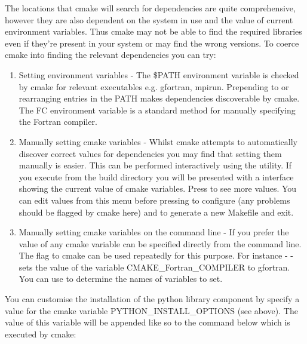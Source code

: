 \documentclass[letterpaper,10pt,english]{sphinxmanual}
\begin{document}

The locations that cmake will search for dependencies are quite comprehensive, however they are also dependent on the system in use and the value of current environment variables. Thus cmake may not be able to find the required libraries even if they’re present in your system or may find the wrong versions. To coerce cmake into finding the relevant dependencies you can try:
\begin{enumerate}
\item {} 
Setting environment variables - The \$PATH environment variable is checked by cmake for relevant executables e.g. gfortran, mpirun. Prepending to or rearranging entries in the PATH makes dependencies discoverable by cmake. The FC environment variable is a standard method for manually specifying the Fortran compiler.

\item {} 
Manually setting cmake variables - Whilst cmake attempts to automatically discover correct values for dependencies you may find that setting them manually is easier. This can be performed interactively using the  utility. If you execute  from the build directory you will be presented with a interface showing the current value of cmake variables. Press  to see more values. You can edit values from this menu before pressing  to configure (any problems should be flagged by cmake here) and  to generate a new Makefile and exit.

\item {} 
Manually setting cmake variables on the command line - If you prefer the value of any cmake variable can be specified directly from the command line. The  flag to cmake can be used repeatedly for this purpose. For instance -  - sets the value of the  variable CMAKE\_Fortran\_COMPILER to gfortran. You can use  to determine the names of variables to set.

\end{enumerate}


You can customise the installation of the python library component by specify a value for the cmake variable PYTHON\_INSTALL\_OPTIONS (see above). The value of this variable will be appended like so to the command below which is executed by cmake:
\end{document}

